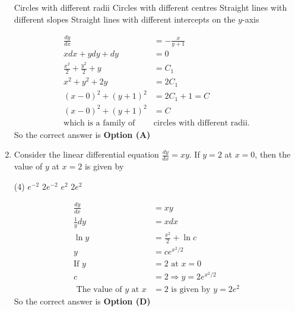 \begin{enumerate}[label=\color{ocre}\textbf{\arabic*.}]
\begin{tasks}
\task[\textbf{A.}] Circles with different radii
\task[\textbf{B.}] Circles with different centres
\task[\textbf{C.}]  Straight lines with different slopes
\task[\textbf{D.}]  Straight lines with different intercepts on the $y$-axis
\end{tasks}
\begin{answer}
	$$
\begin{aligned}
\frac{d y}{d x}&=-\frac{x}{y+1} \\ x d x+y d y+d y&=0 \\ \frac{x^{2}}{2}+\frac{y^{2}}{2}+y&=C_{1}\\ x^{2}+y^{2}+2 y&=2 C_{1}\\
(x-0)^{2}+(y+1)^{2}&=2 C_{1}+1=C\\
(x-0)^{2}+(y+1)^{2}&=C\\
\text{which is a family of }&\text{circles with different radii.}
\end{aligned}
$$
So the correct answer is \textbf{Option (A)}
\end{answer}

\item Consider the linear differential equation $\frac{d y}{d x}=x y$. If $y=2$ at $x=0$, then the value of $y$ at $x=2$ is given by
{}
\begin{tasks}(4)
\task[\textbf{A.}]  $e^{-2}$
\task[\textbf{B.}] $2 e^{-2}$
\task[\textbf{C.}] $e^{2}$
\task[\textbf{D.}]  $2 e^{2}$
\end{tasks}
\begin{answer}
	$$
\begin{aligned}
\frac{d y}{d x}&=x y \\ \frac{1}{y} d y&=x d x \\ \ln y&=\frac{x^{2}}{2}+\ln c \\ y&=c e^{x^{2} / 2}\\
\text{If }y&=2\text{ at }x=0 \\ c&=2 \Rightarrow y=2 e^{x^{2} / 2}\\
\text{	The value of $y$ at }x&=2\text{ is given by }y=2 e^{2}
\end{aligned}
$$
So the correct answer is \textbf{Option (D)}
\end{answer}


\end{enumerate}
